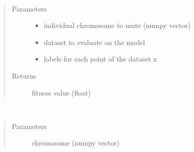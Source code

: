 \documentclass[letterpaper,10pt,english]{sphinxmanual}
\begin{document}
\begin{fulllineitems}
\begin{fulllineitems}
\end{fulllineitems}


\begin{fulllineitems}
\label{\detokenize{index:genetic_optimizer.GeneticRegularizator.fitness}}~\begin{quote}\begin{description}
\item[{Parameters}] \leavevmode\begin{itemize}
\item {} 
 \textendash{} individual chromosome to mute (numpy vector)

\item {} 
 \textendash{} dataset to evaluate on the model

\item {} 
 \textendash{} labels for each point of the dataset x

\end{itemize}

\item[{Returns}] \leavevmode
fitness value (float)

\end{description}\end{quote}

\end{fulllineitems}


\begin{fulllineitems}
\label{\detokenize{index:genetic_optimizer.GeneticRegularizator.transform_weights}}~\begin{quote}\begin{description}
\item[{Parameters}] \leavevmode
{} \textendash{} chromosome (numpy vector)


\end{description}
\end{quote}
\end{fulllineitems}
\end{fulllineitems}
\end{document}
